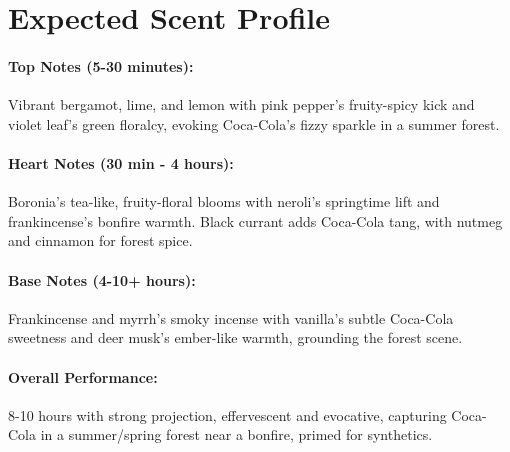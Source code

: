 \documentclass{article}
\begin{document}
\section*{Expected Scent Profile}

\paragraph{\textcolor{colaRed}{\textbf{Top Notes (5-30 minutes):}}}
Vibrant bergamot, lime, and lemon with pink pepper’s fruity-spicy kick and violet leaf’s green floralcy, evoking Coca-Cola’s fizzy sparkle in a summer forest.

\paragraph{\textcolor{colaBrown}{\textbf{Heart Notes (30 min - 4 hours):}}}
Boronia’s tea-like, fruity-floral blooms with neroli’s springtime lift and frankincense’s bonfire warmth. Black currant adds Coca-Cola tang, with nutmeg and cinnamon for forest spice.

\paragraph{\textcolor{colaDark}{\textbf{Base Notes (4-10+ hours):}}}
Frankincense and myrrh’s smoky incense with vanilla’s subtle Coca-Cola sweetness and deer musk’s ember-like warmth, grounding the forest scene.

\paragraph{\textcolor{violetPurple}{\textbf{Overall Performance:}}}
8-10 hours with strong projection, effervescent and evocative, capturing Coca-Cola in a summer/spring forest near a bonfire, primed for synthetics.
\end{document}
